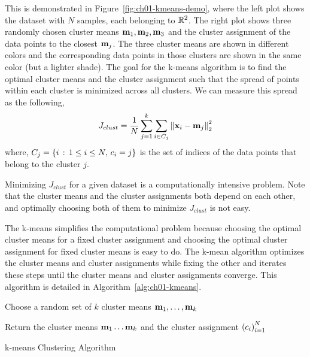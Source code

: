 This is demonstrated in Figure~\ref{fig:ch01-kmeans-demo}, where the left plot shows the dataset with $N$ samples, each belonging to $\mathbb{R}^2$. The right plot shows three randomly chosen cluster means $\mathbf{m}_1, \mathbf{m}_2, \mathbf{m}_3$ and the cluster assignment of the data points to the closest $\mathbf{m}_j$. The three cluster means are shown in different colors and the corresponding data points in those clusters are shown in the same color (but a lighter shade). The goal for the k-means algorithm is to find the optimal cluster means and the cluster assignment such that the spread of points within each cluster is minimized across all clusters. We can measure this spread as the following,
\begin{equation}
    J_{clust} = \frac{1}{N}\sum_{j=1}^k \sum_{i \in C_j} \left\lVert \mathbf{x}_i - \mathbf{m}_j \right\rVert_2^2
    \label{eq:ch01-kmeans-cost}
\end{equation}
where, $C_j = \left\{ i \, : \, 1 \leq i \leq N, \, c_i = j\right\}$ is the set of indices of the data points that belong to the cluster $j$.

Minimizing $J_{clust}$ for a given dataset is a computationally intensive problem. Note that the cluster means and the cluster assignments both depend on each other, and optimally choosing both of them to minimize $J_{clust}$ is not easy. 

The k-means simplifies the computational problem because choosing the optimal cluster means for a fixed cluster assignment and choosing the optimal cluster assignment for fixed cluster means is easy to do. The k-mean algorithm optimizes the cluster means and cluster assignments while fixing the other and iterates these steps until the cluster means and cluster assignments converge. This algorithm is detailed in Algorithm~\ref{alg:ch01-kmeans}.

\begin{boxedstuff}
    \begin{algorithm}[H]
    \SetAlgoLined
    \BlankLine
    Choose a random set of $k$ cluster means $\mathbf{m}_1,\ldots,\mathbf{m}_k$\;

    Return the cluster means $\mathbf{m}_1 \ldots \mathbf{m}_k$ and the cluster assignment $\left( c_i \right)_{i=1}^N$\;
    \caption{k-means Clustering Algorithm}
    \label{alg:ch01-kmeans}
    \end{algorithm}
\end{boxedstuff}



